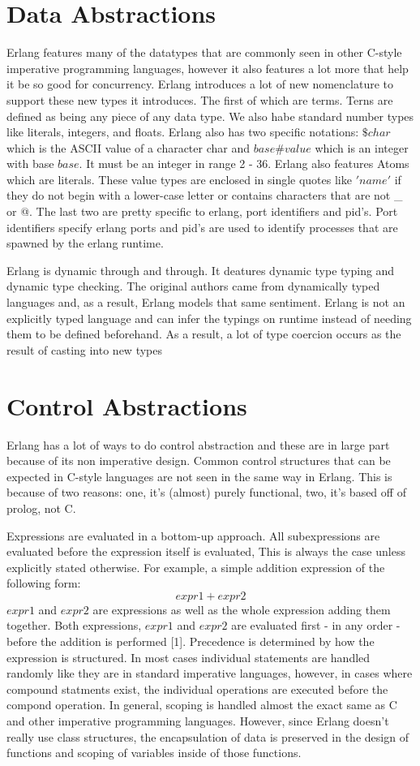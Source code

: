 \documentclass[11pt]{article}
\begin{document}
\section{Data Abstractions}
Erlang features many of the datatypes that are commonly seen in other C-style imperative programming languages, however it also features a lot more that help it be so good for concurrency. Erlang introduces a lot of new nomenclature to support these new types it
introduces. The first of which are terms. Terns are defined as being any piece of any data type. We also habe standard number types like literals, integers, and floats. Erlang also has two specific notations: $\$char$ which is the ASCII value of a character char
and $base\#value$ which is an integer with base $base$. It must be an integer in range 2 - 36. Erlang also features Atoms which are literals. These value types are enclosed in single quotes like $'name'$ if they do not begin with a lower-case letter or contains
characters that are not \_ or @. The last two are pretty specific to erlang, port identifiers and pid's. Port identifiers specify erlang ports and pid's are used to  identify processes that are spawned by the erlang runtime.

Erlang is dynamic through and through. It deatures dynamic type typing and dynamic type checking. The original authors came from dynamically typed languages and, as a result, Erlang models that same sentiment. Erlang is not an explicitly typed language and can
infer the typings on runtime instead of needing them to be defined beforehand. As a result, a lot of type coercion occurs as the result of casting into new types

\section{Control Abstractions}
Erlang has a lot of ways to do control abstraction and these are in large part because of its non imperative design. Common control structures that can be expected in C-style
languages are not seen in the same way in Erlang. This is because of two reasons: one, it's (almost) purely functional, two, it's based off of prolog, not C.


Expressions are evaluated in a bottom-up approach. All subexpressions are evaluated before the expression itself is evaluated, This is always the case unless explicitly stated
otherwise. For example, a simple addition expression of the following form: $$expr1 + expr2$$ $expr1$ and $expr2$ are expressions as well as the whole expression adding them
together. Both expressions, $expr1$ and $expr2$ are evaluated first - in any order - before the addition is performed [1]. Precedence is determined by how the expression is
structured. In most cases individual statements are handled randomly like they are in standard imperative languages, however, in cases where compound statments exist, the individual operations are executed before the compond operation. In general, scoping is
handled almost the exact same as C and other imperative programming languages. However, since Erlang doesn't really use class structures, the encapsulation of data is preserved in the design of functions and scoping of variables inside of those functions.
\end{document}
